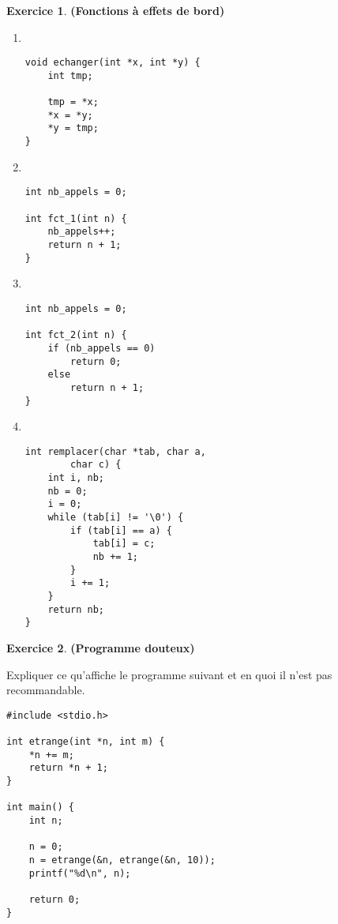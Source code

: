 \documentclass[12pt]{article}
\theoremstyle{definition}
\newtheorem{Exercice}{Exercice}
\begin{document}
\begin{Exercice} {\bf (Fonctions à effets de bord)}
\begin{enumerate}
\begin{multicols}{2}
\begin{enumerate}
            \item ~
\begin{lstlisting}
void echanger(int *x, int *y) {
    int tmp;

    tmp = *x;
    *x = *y;
    *y = tmp;
}
\end{lstlisting}
            \bigskip

            \item ~
\begin{lstlisting}
int nb_appels = 0;

int fct_1(int n) {
    nb_appels++;
    return n + 1;
}
\end{lstlisting}
            \medskip

            \item ~
\begin{lstlisting}
int nb_appels = 0;

int fct_2(int n) {
    if (nb_appels == 0)
        return 0;
    else
        return n + 1;
}
\end{lstlisting}

            \item ~
\begin{lstlisting}
int remplacer(char *tab, char a,
        char c) {
    int i, nb;
    nb = 0;
    i = 0;
    while (tab[i] != '\0') {
        if (tab[i] == a) {
            tab[i] = c;
            nb += 1;
        }
        i += 1;
    }
    return nb;
}
\end{lstlisting}
        \end{enumerate}
    \end{multicols}
\end{enumerate}
\end{Exercice}
\bigskip

\begin{Exercice} {\bf (Programme douteux)}\smallskip

Expliquer ce qu'affiche le programme suivant et en quoi il n'est pas
recommandable.
\begin{lstlisting}
#include <stdio.h>

int etrange(int *n, int m) {
    *n += m;
    return *n + 1;
}

int main() {
    int n;

    n = 0;
    n = etrange(&n, etrange(&n, 10));
    printf("%d\n", n);

    return 0;
}
\end{lstlisting}
\end{Exercice}
\bigskip
\end{document}
